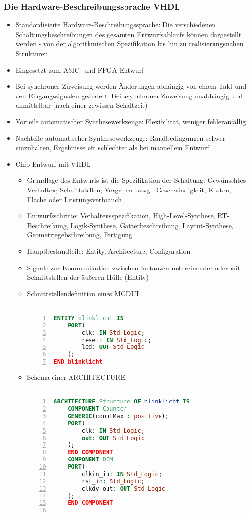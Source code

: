 \subsubsection{Die Hardware-Beschreibungssprache VHDL}
\begin{itemize}
	\item Standardisierte Hardware-Beschreibungssprache: Die verschiedenen Schaltungsbeschreibungen des gesamten Entwurfsablaufs können dargestellt werden - von der algorithmischen Spezifikation bis hin zu realisierungsnahen Strukturen
	\item Eingesetzt zum ASIC- und FPGA-Entwurf
	\item Bei synchroner Zuweisung werden Änderungen abhängig von einem Takt und den Eingangssignalen geändert. Bei asynchroner Zuweisung unabhängig und unmittelbar (nach einer gewissen Schaltzeit)
	\item Vorteile automatischer Synthesewerkzeuge: Flexibilität, weniger fehleranfällig
	\item Nachteile automatischer Synthesewerkzeuge: Randbedingungen schwer einzuhalten, Ergebnisse oft schlechter als bei manuellem Entwurf
	\item Chip-Entwurf mit VHDL
	\begin{itemize}
		\item Grundlage des Entwurfs ist die Spezifikation der Schaltung: Gewünschtes Verhalten; Schnittstellen; Vorgaben bzwgl. Geschwindigkeit, Kosten, Fläche oder Leistungsverbrauch
		\item Entwurfsschritte: Verhaltensspezifikation, High-Level-Synthese, RT-Beschreibung, Logik-Synthese, Gatterbeschreibung, Layout-Synthese, Geometriegebschreibung, Fertigung
		\item Hauptbestandteile: Entity, Architecture, Configuration
		\item Signale zur Kommunikation zwischen Instanzen untereinander oder mit Schnittstellen der äußeren Hülle (Entity)
		\item Schnittstellendefinition eines MODUL\\\\
			\begin{minipage}{\linewidth}
			\begin{lstlisting}[frame=single,numbers=left,mathescape,language=VHDL,tabsize=4]
ENTITY blinklicht IS
	PORT(
		clk: IN Std_Logic;
		reset: IN Std_Logic;
		led: OUT Std_Logic
	);
END blinklicht
			\end{lstlisting}
			\end{minipage}
		\item Schema einer ARCHITECTURE\\\\
			\begin{minipage}{\linewidth}
			\begin{lstlisting}[frame=single,numbers=left,mathescape,language=VHDL,tabsize=4]
ARCHITECTURE Structure OF blinklicht IS
	COMPONENT Counter
	GENERIC(countMax : positive);
	PORT(
		clk: IN Std_Logic;
		out: OUT Std_Logic
	);
	END COMPONENT
	COMPONENT DCM
	PORT(
		clkin_in: IN Std_Logic;
		rst_in: Std_Logic;
		clkdv_out: OUT Std_Logic
	);
	END COMPONENT


\end{lstlisting}
\end{minipage}
\end{itemize}
\end{itemize}

